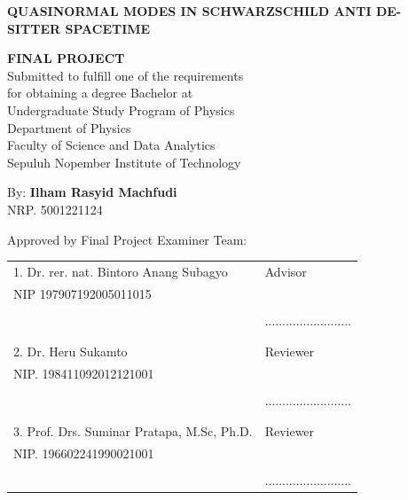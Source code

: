

\begin{center}
  \textbf{QUASINORMAL MODES IN SCHWARZSCHILD ANTI DE-SITTER SPACETIME}
\end{center}

\begingroup
  \small

  \begin{center}
    \textbf{FINAL PROJECT} \\
    Submitted to fulfill one of the requirements \\
    for obtaining a degree Bachelor at \\
    Undergraduate Study Program of Physics \\
    Department of Physics\\
    Faculty of Science and Data Analytics \\
    Sepuluh Nopember Institute of Technology \\
  \end{center}

  \begin{center}
    By: \textbf{Ilham Rasyid Machfudi} \\
    NRP. 5001221124
  \end{center}

  \begin{center}
    Approved by Final Project Examiner Team:
  \end{center}

  \begingroup
    \setlength{\tabcolsep}{0pt}

    \noindent
    \begin{tabularx}{\textwidth}{X l}
  1. Dr. rer. nat. Bintoro Anang Subagyo      & Advisor \\
  NIP 197907192005011015        &  \\
  &  \\
  & ......................... \\
  &  \\
  &  \\
  2. Dr. Heru Sukamto & Reviewer \\
  NIP. 198411092012121001 & \\
  &  \\
  & ......................... \\
  &  \\
  &  \\
  3. Prof. Drs. Suminar Pratapa, M.Sc, Ph.D. & Reviewer\\
  NIP. 196602241990021001 &  \\
  &  \\
  & .........................\\
    \end{tabularx}
  \endgroup

